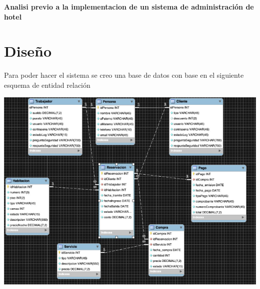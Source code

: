 \documentclass[12pt]{article}
\begin{document}
\vspace{4cm}
\begin{flushleft}
\begin{Large}
\textbf{Analisi previo a la implementacion de un sistema de administración de hotel}
\end{Large}

\section{Diseño}

\textsf{Para poder hacer el sistema se creo una base de datos con base en el siguiente esquema de entidad relación}

\vspace{0.5cm}
\begin{center}
\includegraphics[width=15cm]{EER.png}
\end{center}
\vspace{0.5cm}


\end{flushleft}
\end{document}
